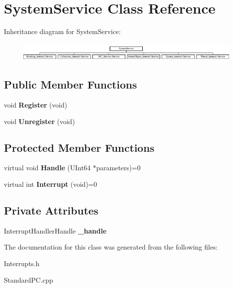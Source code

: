 \hypertarget{class_system_service}{}\section{System\+Service Class Reference}
\label{class_system_service}
Inheritance diagram for System\+Service\+:\begin{figure}[H]
\begin{center}
\leavevmode
\includegraphics[height=0.967185cm]{class_system_service}
\end{center}
\end{figure}
\subsection*{Public Member Functions}
\begin{DoxyCompactItemize}
\item 
\mbox{\label{class_system_service_a1d2f3efeef2c074e895a5a9fc25aa825}} 
void {\bfseries Register} (void)
\item 
\mbox{\label{class_system_service_a7343bc0ccd31143a326900e2ef2b0e00}} 
void {\bfseries Unregister} (void)
\end{DoxyCompactItemize}
\subsection*{Protected Member Functions}
\begin{DoxyCompactItemize}
\item 
\mbox{\label{class_system_service_afdfed9d81c70151bd251e40c1f09dc90}} 
virtual void {\bfseries Handle} (U\+Int64 $\ast$parameters)=0
\item 
\mbox{\label{class_system_service_ab64e0df748ae33e98180cb490076d41e}} 
virtual int {\bfseries Interrupt} (void)=0
\end{DoxyCompactItemize}
\subsection*{Private Attributes}
\begin{DoxyCompactItemize}
\item 
\mbox{\label{class_system_service_a3989abe1ee5ad1ce21c302d23e63b367}} 
Interrupt\+Handler\+Handle {\bfseries \+\_\+handle}
\end{DoxyCompactItemize}


The documentation for this class was generated from the following files\+:\begin{DoxyCompactItemize}
\item 
Interrupts.\+h\item 
Standard\+P\+C.\+cpp\end{DoxyCompactItemize}

